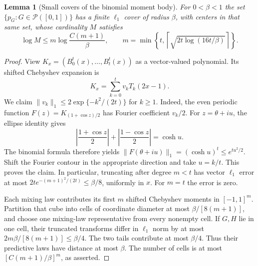 \documentclass[11pt,a4paper]{article}
\newtheorem{lemma}[theorem]{Lemma}
\theoremstyle{definition}
\theoremstyle{remark}
\numberwithin{equation}{section}
\begin{document}
\begin{lemma}[Small covers of the binomial moment body]
\label{p8:p06:bm:cover}
For $0<\beta<1$ the set $\{p_G:G\in\mathcal P([0,1])\}$ has a finite
$\ell_1$ cover of radius $\beta$, with centers in that same set, whose
cardinality $M$ satisfies
\begin{equation}\label{p8:p06:bm:entropy}
 \log M\le m\log\frac{C(m+1)}\beta,
 \qquad
 m=\min\left\{t,
       \left\lceil\sqrt{2t\log(16t/\beta)}\right\rceil\right\}.
\end{equation}
\end{lemma}
\begin{proof}
View $K_x=(B_0^t(x),\ldots,B_t^t(x))$ as a vector-valued polynomial.
Its shifted Chebyshev expansion is
\[
 K_x=\sum_{k=0}^t v_kT_k(2x-1).
\]
We claim $\|v_k\|_1\le2\exp\{-k^2/(2t)\}$ for $k\ge1$.
Indeed, the even periodic function
$F(z)=K_{(1+\cos z)/2}$ has Fourier coefficient $v_k/2$.
For $z=\theta+iu$, the ellipse identity gives
\[
 \left|\frac{1+\cos z}{2}\right|
 +\left|\frac{1-\cos z}{2}\right|=\cosh u.
\]
The binomial formula therefore yields
$\|F(\theta+iu)\|_1=(\cosh u)^t\le e^{tu^2/2}$.
Shift the Fourier contour in the appropriate direction and take
$u=k/t$. This proves the claim. In particular, truncating after degree
$m<t$ has vector $\ell_1$ error at most
$2t e^{-(m+1)^2/(2t)}\le\beta/8$, uniformly in $x$.
For $m=t$ the error is zero.

Each mixing law contributes its first $m$ shifted Chebyshev moments in
$[-1,1]^m$. Partition that cube into cells of coordinate diameter at most
$\beta/[8(m+1)]$, and choose one mixing-law representative from every
nonempty cell. If $G,H$ lie in one cell, their truncated transforms differ
in $\ell_1$ norm by at most
$2m\beta/[8(m+1)]\le\beta/4$. The two tails contribute at most
$\beta/4$. Thus their predictive laws have distance at most $\beta$.
The number of cells is at most $[C(m+1)/\beta]^m$, as asserted.
\end{proof}
\end{document}
